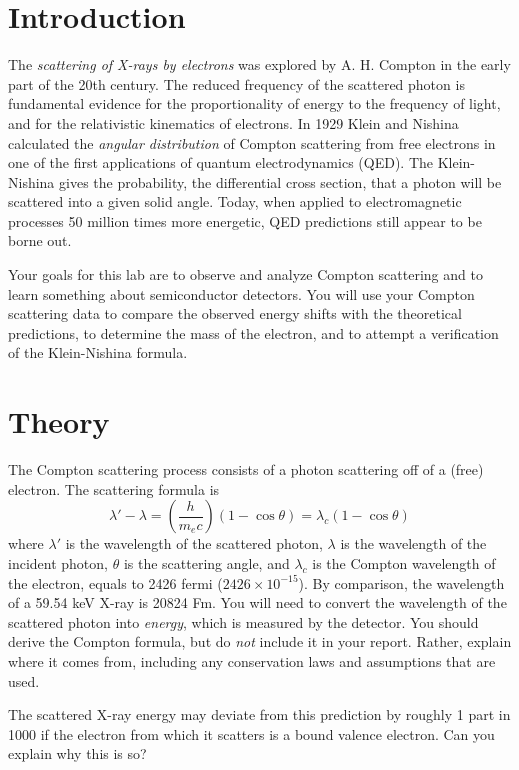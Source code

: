 \documentclass{../lab}
\begin{document}
\section{Introduction}

The \emph{scattering of X-rays by electrons }was explored by A. H. Compton in the early part of the 20th century. The reduced frequency of the scattered photon is fundamental evidence for the proportionality of energy to the frequency of light, and for the relativistic kinematics of electrons. In 1929 Klein and Nishina calculated the \emph{angular distribution} of Compton scattering from free electrons in one of the first applications of quantum electrodynamics (QED). The Klein-Nishina gives the probability, the differential cross section, that a photon will be scattered into a given solid angle. Today, when applied to electromagnetic processes 50 million times more energetic, QED predictions still appear to be borne out.

Your goals for this lab are to observe and analyze Compton scattering and to learn something about semiconductor detectors. You will use your Compton scattering data to compare the observed energy shifts with the theoretical predictions, to determine the mass of the electron, and to attempt a verification of the Klein-Nishina formula.

\section{Theory}

The Compton scattering process consists of a photon scattering off of a (free) electron. The scattering formula is
\begin{equation}
    \lambda'-\lambda=\left ( \frac{h}{m_ec}\right)\left (1-\cos{\theta}\right )=\lambda_c(1-\cos{\theta})
\end{equation}
where $\lambda'$ is the wavelength of the scattered photon, $\lambda$ is the wavelength of the incident photon, $\theta$ is the scattering angle, and $\lambda_c$ is the Compton wavelength of the electron, equals to 2426 fermi ($2426 \times 10^{-15}$). By comparison, the wavelength of a 59.54 keV X-ray is 20824 Fm. You will need to convert the wavelength of the scattered photon into \emph{energy}, which is measured by the detector. You should derive the Compton formula, but do \emph{not} include it in your report. Rather, explain where it comes from, including any conservation laws and assumptions that are used.

The scattered X-ray energy may deviate from this prediction by roughly 1 part in 1000 if the electron from which it scatters is a bound valence electron. Can you explain why this is so?
\end{document}
